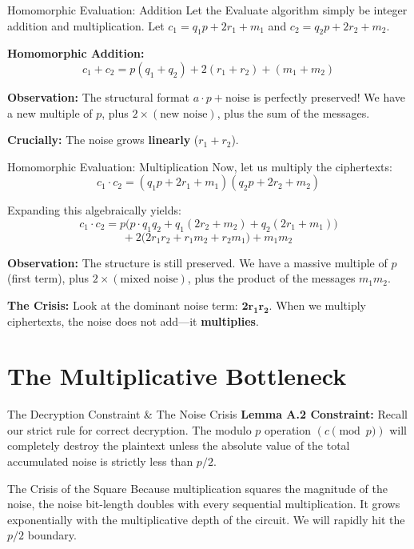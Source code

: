 \documentclass[10pt, aspectratio=169]{beamer}
\begin{document}
\begin{frame}{Homomorphic Evaluation: Addition}
    Let the Evaluate algorithm simply be integer addition and multiplication. 
    Let $c_1 = q_1 p + 2r_1 + m_1$ and $c_2 = q_2 p + 2r_2 + m_2$.
    \pause

    \vspace{0.3cm}
    \textbf{Homomorphic Addition:}
    $$c_1 + c_2 = p(q_1 + q_2) + 2(r_1 + r_2) + (m_1 + m_2)$$
    \pause
    
    \vspace{0.3cm}
    \textbf{Observation:}
    The structural format $a\cdot p + \text{noise}$ is perfectly preserved! We have a new multiple of $p$, plus $2 \times (\text{new noise})$, plus the sum of the messages. 
    
    \vspace{0.2cm}
    \textbf{Crucially:} The noise grows \textbf{linearly} ($r_1 + r_2$).
\end{frame}

\begin{frame}{Homomorphic Evaluation: Multiplication}
    Now, let us multiply the ciphertexts:
    $$c_1 \cdot c_2 = (q_1 p + 2r_1 + m_1)(q_2 p + 2r_2 + m_2)$$
    \pause
    
    Expanding this algebraically yields:
    $$c_1 \cdot c_2 = p \big( p \cdot q_1 q_2 + q_1(2r_2 + m_2) + q_2(2r_1 + m_1) \big)$$
    $$+ \ 2 \big( 2r_1 r_2 + r_1 m_2 + r_2 m_1 \big) + m_1 m_2$$
    \pause
    
    \vspace{0.3cm}
    \textbf{Observation:}
    The structure is still preserved. We have a massive multiple of $p$ (first term), plus $2 \times (\text{mixed noise})$, plus the product of the messages $m_1 m_2$.
    
    \vspace{0.2cm}
    \textbf{The Crisis:} Look at the dominant noise term: $\mathbf{2r_1 r_2}$. When we multiply ciphertexts, the noise does not add—it \textbf{multiplies}.
\end{frame}

\section{The Multiplicative Bottleneck}

\begin{frame}{The Decryption Constraint \& The Noise Crisis}
    \textbf{Lemma A.2 Constraint:} 
    Recall our strict rule for correct decryption. The modulo $p$ operation $(c \pmod p)$ will completely destroy the plaintext unless the absolute value of the total accumulated noise is strictly less than $p/2$.
    \pause
    
    \vspace{0.3cm}
    \begin{block}{The Crisis of the Square}
    Because multiplication squares the magnitude of the noise, the noise bit-length doubles with every sequential multiplication. It grows exponentially with the multiplicative depth of the circuit. We will rapidly hit the $p/2$ boundary.
    \end{block}
\end{frame}
\end{document}
